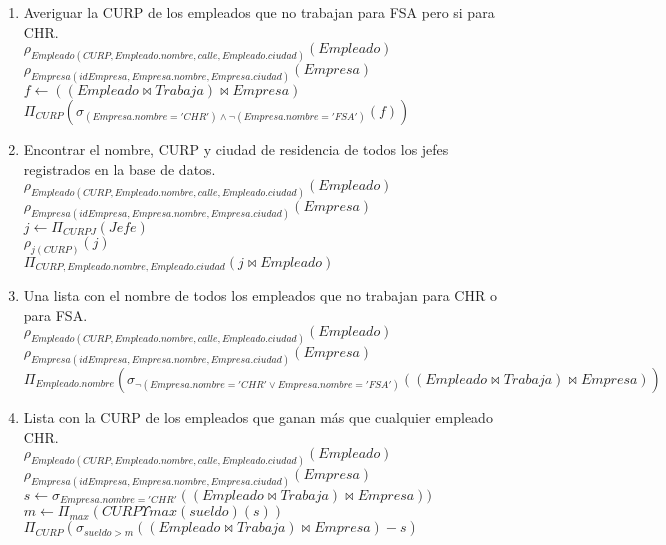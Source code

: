 \documentclass{article}
\begin{document}
\begin{enumerate}
\begin{enumerate}
				\item Averiguar la CURP de los empleados que no trabajan para FSA pero si para CHR.\\
				
				$\rho_{Empleado(CURP, Empleado.nombre, calle, Empleado.ciudad)}(Empleado)$\\
				$\rho_{Empresa(idEmpresa, Empresa.nombre, Empresa.ciudad)}(Empresa)$\\
				$f \leftarrow ((Empleado \bowtie Trabaja) \bowtie Empresa)$\\
				$\Pi_{CURP}(\sigma_{(Empresa.nombre = 'CHR') \land \lnot(Empresa.nombre = 'FSA')}(f))$\\
				
				\item Encontrar el nombre, CURP y ciudad de residencia de todos los jefes registrados en la base de
				datos.\\
				
				$\rho_{Empleado(CURP, Empleado.nombre, calle, Empleado.ciudad)}(Empleado)$\\
				$\rho_{Empresa(idEmpresa, Empresa.nombre, Empresa.ciudad)}(Empresa)$\\
				$j \leftarrow \Pi_{CURPJ}(Jefe)$\\
				$\rho_{j(CURP)}(j)$\\
				$\Pi_{CURP, Empleado.nombre, Empleado.ciudad}(j \bowtie Empleado)$\\
				
				\item Una lista con el nombre de todos los empleados que no trabajan para CHR o para FSA.\\
				
				$\rho_{Empleado(CURP, Empleado.nombre, calle, Empleado.ciudad)}(Empleado)$\\
				$\rho_{Empresa(idEmpresa, Empresa.nombre, Empresa.ciudad)}(Empresa)$\\
				$\Pi_{Empleado.nombre}(\sigma_{\lnot(Empresa.nombre = 'CHR' \lor Empresa.nombre = 'FSA')}((Empleado \bowtie Trabaja) \bowtie Empresa))$\\
				
				\item Lista con la CURP de los empleados que ganan más que cualquier empleado CHR.\\
				
				$\rho_{Empleado(CURP, Empleado.nombre, calle, Empleado.ciudad)}(Empleado)$\\
				$\rho_{Empresa(idEmpresa, Empresa.nombre, Empresa.ciudad)}(Empresa)$\\
				$s \leftarrow \sigma_{Empresa.nombre = 'CHR'}((Empleado \bowtie Trabaja) \bowtie Empresa))$\\
				$m \leftarrow \Pi_{max}(CURP \Upsilon max(sueldo)(s))$\\
				$\Pi_{CURP}(\sigma_{sueldo > m}((Empleado \bowtie Trabaja) \bowtie Empresa) - s)$\\
				

\end{enumerate}
\end{enumerate}
\end{document}
